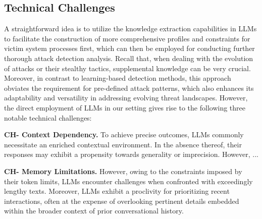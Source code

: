
\subsection{Technical Challenges}\label{sec:challenges}
A straightforward idea is to utilize the knowledge extraction capabilities in LLMs to facilitate the construction of more comprehensive profiles and constraints for victim system processes first, which can then be employed for conducting further thorough attack detection analysis. Recall that,
when dealing with the evolution of attacks or their stealthy tactics, supplemental knowledge can be very crucial. Moreover, in contrast to learning-based detection methods, this approach obviates the requirement for pre-defined attack patterns, which also enhances its adaptability and versatility in addressing evolving threat landscapes.
However, the direct employment of LLMs in our setting gives rise to the following three notable technical challenges:


\noindent
{\bf CH- Context Dependency.} %
To achieve precise outcomes, LLMs commonly necessitate an enriched contextual environment. In the absence thereof, their responses may exhibit a propensity towards generality or imprecision. However, ... 

\noindent
{\bf CH- Memory Limitations.} %
 However, owing to the constraints imposed by their token limits, LLMs encounter challenges when confronted with exceedingly lengthy texts. Moreover, LLMs exhibit a proclivity for prioritizing recent interactions, often at the expense of overlooking pertinent details embedded within the broader context of prior conversational history.

